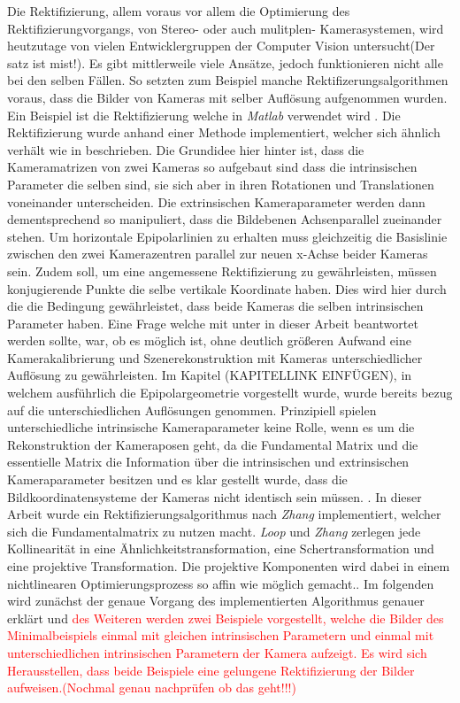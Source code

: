 Die Rektifizierung, allem voraus vor allem die Optimierung des Rektifizierungvorgangs, von Stereo- oder auch mulitplen- Kamerasystemen, wird heutzutage von vielen Entwicklergruppen der Computer Vision untersucht(Der satz ist mist!). Es gibt mittlerweile viele Ansätze, jedoch funktionieren nicht alle bei den selben Fällen. So setzten zum Beispiel manche Rektifizerungsalgorithmen voraus, dass die Bilder von Kameras mit selber Auflösung aufgenommen wurden. Ein Beispiel ist die Rektifizierung welche in \textit{Matlab} verwendet wird \cite{MatlabRec}. Die Rektifizierung wurde anhand einer Methode implementiert, welcher sich ähnlich verhält wie in \cite{FusielloSite} beschrieben. Die Grundidee hier hinter ist, dass die Kameramatrizen von zwei Kameras so aufgebaut sind dass die intrinsischen Parameter die selben sind, sie sich aber in ihren Rotationen und Translationen voneinander unterscheiden. Die extrinsischen Kameraparameter werden dann dementsprechend so manipuliert, dass die Bildebenen Achsenparallel zueinander stehen\cite{FusielloSite,Fusiello}. Um horizontale Epipolarlinien zu erhalten muss gleichzeitig die Basislinie zwischen den zwei Kamerazentren parallel zur neuen x-Achse beider Kameras sein. Zudem soll, um eine angemessene Rektifizierung zu gewährleisten, müssen konjugierende Punkte die selbe vertikale Koordinate haben. Dies wird hier durch die die Bedingung gewährleistet, dass beide Kameras die selben intrinsischen Parameter haben\cite{FusielloSite}. Eine Frage welche mit unter in dieser Arbeit beantwortet werden sollte, war, ob es möglich ist, ohne deutlich größeren Aufwand eine Kamerakalibrierung und Szenerekonstruktion mit Kameras unterschiedlicher Auflösung zu gewährleisten. Im Kapitel (KAPITELLINK EINFÜGEN), in welchem ausführlich die Epipolargeometrie vorgestellt wurde, wurde bereits bezug auf die unterschiedlichen Auflösungen genommen. Prinzipiell spielen unterschiedliche intrinsische Kameraparameter keine Rolle, wenn es um die Rekonstruktion der Kameraposen geht, da die Fundamental Matrix und die essentielle Matrix die Information über die intrinsischen und extrinsischen Kameraparameter besitzen und es klar gestellt wurde, dass die Bildkoordinatensysteme der Kameras nicht identisch sein müssen. \cite{Elements}. In dieser Arbeit wurde ein Rektifizierungsalgorithmus nach \textit{Zhang}\cite{ZZ} implementiert, welcher sich die Fundamentalmatrix zu nutzen macht. \textit{Loop} und \textit{Zhang} zerlegen jede Kollinearität in eine Ähnlichkeitstransformation, eine Schertransformation und eine projektive Transformation. Die projektive Komponenten wird dabei in einem nichtlinearen Optimierungsprozess so affin wie möglich gemacht.\cite{Fusiello,ZZ}. Im folgenden wird zunächst der genaue Vorgang des implementierten Algorithmus genauer erklärt und 
\textcolor{red}{des Weiteren werden zwei Beispiele vorgestellt, welche die Bilder des Minimalbeispiels einmal mit gleichen intrinsischen Parametern und einmal mit unterschiedlichen intrinsischen Parametern der Kamera aufzeigt. Es wird sich Herausstellen, dass beide Beispiele eine gelungene Rektifizierung der Bilder aufweisen.(Nochmal genau nachprüfen ob das geht!!!)}\\


